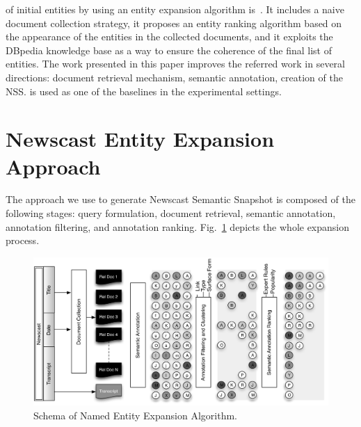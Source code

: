 \documentclass{llncs}
\newcommand{\hg}[1]{\colorbox{yellow}{#1}}
\begin{document}
of initial entities by using an entity expansion algorithm is~\cite{RedondoGarcia2014}. It includes a naive document collection strategy, it proposes an entity ranking algorithm based on the appearance of the entities in the collected documents, and it exploits the DBpedia knowledge base as a way to ensure the coherence of the final list of entities. The work presented in this paper improves the referred work in several directions: document retrieval mechanism, semantic annotation, creation of the NSS. \cite{RedondoGarcia2014} is used as one of the baselines in the experimental settings.%

\section{Newscast Entity Expansion Approach}
\label{sec:Approach}
The approach we use to generate Newscast Semantic Snapshot is composed of the following stages: query formulation, document retrieval, semantic annotation, annotation filtering, and annotation ranking. Fig.~\ref{fig:namedEntityExpansion} depicts the whole expansion process.
\begin{figure}[h!]
\centering
\includegraphics[width=1\textwidth]{figure/ExpansionDiagram}
\caption{Schema of Named Entity Expansion Algorithm.}
\label{fig:namedEntityExpansion}%
\end{figure}
\end{document}
